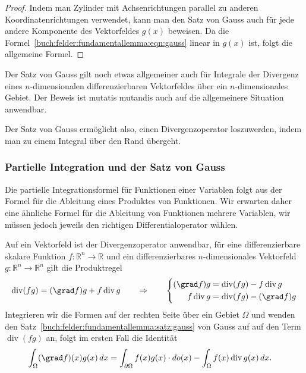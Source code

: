 \begin{proof}
Indem man Zylinder mit Achsenrichtungen parallel zu anderen
Koordinatenrichtungen verwendet, kann man den Satz von Gauss auch für
jede andere Komponente des Vektorfeldes $g(x)$ beweisen.
Da die Formel~\eqref{buch:felder:fundamentallemma:eqn:gauss} 
linear in $g(x)$ ist, folgt die allgemeine Formel.
\end{proof}

Der Satz von Gauss gilt noch etwas allgemeiner auch für Integrale der
Divergenz eines $n$-dimensionalen differenzierbaren Vektorfeldes über
ein $n$-dimensionales Gebiet.
Der Beweis ist mutatis mutandis auch auf die allgemeinere Situation
anwendbar.

Der Satz von Gauss ermöglicht also, einen Divergenzoperator loszuwerden,
indem man zu einem Integral über den Rand übergeht.

%
%
\subsubsection{Partielle Integration und der Satz von Gauss}
Die partielle Integrationsformel für Funktionen einer Variablen folgt aus
der Formel für die Ableitung eines Produktes von Funktionen.
Wir erwarten daher eine ähnliche Formel für die Ableitung von
Funktionen mehrere Variablen, wir müssen jedoch jeweils den richtigen
Differentialoperator wählen.

Auf ein Vektorfeld ist der Divergenzoperator anwendbar, für eine
differenzierbare skalare Funktion $f\colon\mathbb{R}^n\to\mathbb{R}$
und ein differenzierbares $n$-dimensionales Vektorfeld
$g\colon\mathbb{R}^n\to\mathbb{R}^n$ gilt die Produktregel
\[
\operatorname{div}(fg)
=
(\grad f)g
+
f\operatorname{div}g
\qquad\Rightarrow\qquad
\left\{
\begin{aligned}
(\grad f)g &= \operatorname{div}(fg) - f\operatorname{div}g \\
f\operatorname{div}g &= \operatorname{div}(fg) - (\grad f)g
\end{aligned}
\right.
\]
Integrieren wir die Formen auf der rechten Seite über ein Gebiet $\Omega$
und wenden den Satz~\ref{buch:felder:fundamentallemma:satz:gauss}
von Gauss auf auf den Term $\operatorname{div}(fg)$ an, folgt im
ersten Fall die Identität
\begin{align*}
\int_{\Omega} (\grad f)(x) g(x)\,dx
&=
\int_{\partial\Omega} f(x)g(x)\cdot do(x)
-
\int_{\Omega} f(x)\operatorname{div}g(x)\,dx.
\end{align*}

